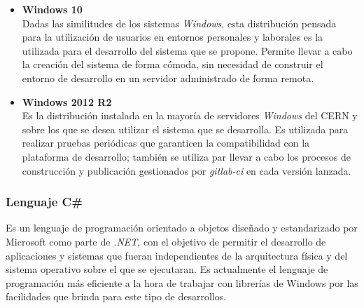             \begin{itemize}
                \item \textbf{Windows 10} \\
                Dadas las similitudes de los sistemas \textit{Windows}, esta distribución pensada para la utilización de usuarios en entornos personales y laborales es la utilizada para el desarrollo del sistema que se propone. Permite llevar a cabo la creación del sistema de forma cómoda, sin necesidad de construir el entorno de desarrollo en un servidor administrado de forma remota.
                
                \item \textbf{Windows 2012 R2} \\
                Es la distribución instalada en la mayoría de servidores \textit{Windows} del CERN y sobre los que se desea utilizar el sistema que se desarrolla. Es utilizada para realizar pruebas periódicas que garanticen la compatibilidad con la plataforma de desarrollo; también se utiliza par llevar a cabo los procesos de construcción y publicación gestionados por \textit{gitlab-ci} en cada versión lanzada.
                
            \end{itemize}

        \subsubsection{Lenguaje C\#}
            Es un lenguaje de programación orientado a objetos diseñado y estandarizado por Microsoft como parte de \textit{.NET}, con el objetivo de permitir el desarrollo de aplicaciones y sistemas que fueran independientes de la arquitectura física y del sistema operativo sobre el que se ejecutaran. Es actualmente el lenguaje de programación más eficiente a la hora de trabajar con librerías de Windows por las facilidades que brinda para este tipo de desarrollos. \cite{csharp}

